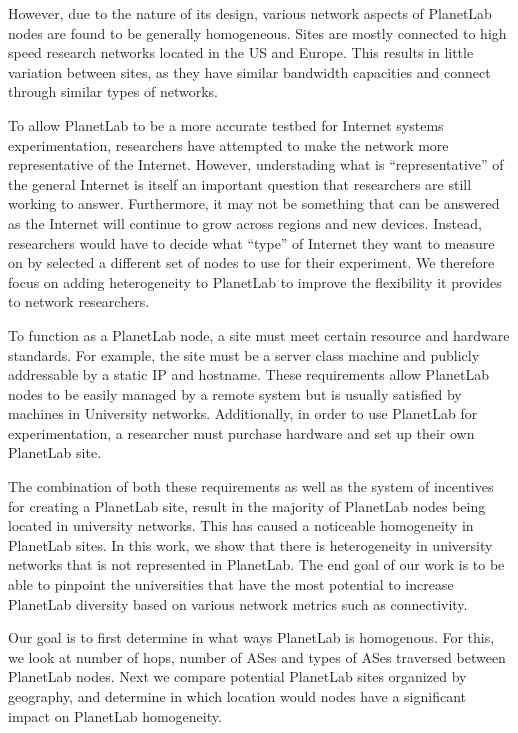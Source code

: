 \documentclass{sig-alternate-10pt}
\begin{document}
However, due to the nature of its design, various network aspects of PlanetLab
nodes are found to be generally homogeneous. Sites are mostly connected to high
speed research networks located in the US and Europe. This results in little
variation between sites, as they have similar bandwidth capacities and connect
through similar types of networks.

To allow PlanetLab to be a more accurate testbed for Internet systems
experimentation, researchers have attempted to make the network more
representative of the Internet. However, understading what is
``representative'' of the general Internet is itself an important question that
researchers are still working to answer. Furthermore, it may not be something
that can be answered as the Internet will continue to grow across regions and
new devices. Instead, researchers would have to decide what ``type'' of
Internet they want to measure on by selected a different set of nodes to use
for their experiment.  We therefore focus on adding heterogeneity to PlanetLab
to improve the flexibility it provides to network researchers.

To function as a PlanetLab node, a site must meet certain resource and hardware
standards. For example, the site must be a server class machine and publicly
addressable by a static IP and hostname. These requirements allow PlanetLab
nodes to be easily managed by a remote system but is usually satisfied by
machines in University networks.  Additionally, in order to use PlanetLab for
experimentation, a researcher must purchase hardware and set up their own
PlanetLab site.\cite{dischinger:satellitelab}

The combination of both these requirements as well as the system of incentives
for creating a PlanetLab site, result in the majority of PlanetLab nodes being
located in university networks. This has caused a noticeable homogeneity in
PlanetLab sites.  In this work, we show that there is heterogeneity in
university networks that is not represented in PlanetLab. The end goal of our
work is to be able to pinpoint the universities that have the most potential to
increase PlanetLab diversity based on various network metrics such as
connectivity.

Our goal is to first determine in what ways PlanetLab is homogenous. For this,
we look at number of hops, number of ASes and types of ASes traversed between
PlanetLab nodes. Next we compare potential PlanetLab sites organized by
geography, and determine in which location would nodes have a significant
impact on PlanetLab homogeneity.
\end{document}
